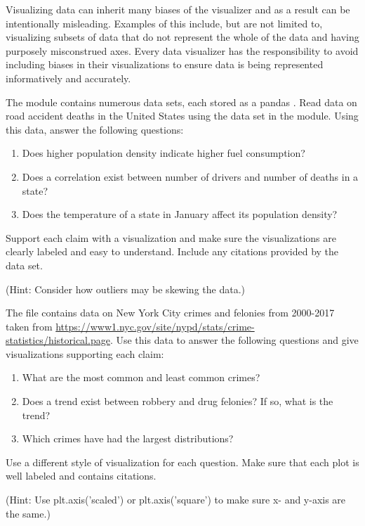 \begin{warn}
Visualizing data can inherit many biases of the visualizer and as a result can be intentionally misleading.
Examples of this include, but are not limited to, visualizing subsets of data that do not represent the whole of the data and having purposely misconstrued axes.
Every data visualizer has the responsibility to avoid including biases in their visualizations to ensure data is being represented informatively and accurately.
\end{warn}
\begin{problem}
The  module contains numerous data sets, each stored as a pandas .
Read data on road accident deaths in the United States using the data set  in the  module.
Using this data, answer the following questions:

\begin{enumerate}
\item Does higher population density indicate higher fuel consumption?
\item Does a correlation exist between number of drivers and number of deaths in a state?
\item Does the temperature of a state in January affect its population density?
\end{enumerate}

Support each claim with a visualization and make sure the visualizations are clearly labeled and easy to understand.
Include any citations provided by the data set.

(Hint: Consider how outliers may be skewing the data.)
\end{problem}

\begin{problem}
The file  contains data on New York City crimes and felonies from 2000-2017 taken from \url{https://www1.nyc.gov/site/nypd/stats/crime-statistics/historical.page}.
Use this data to answer the following questions and give visualizations supporting each claim:
\begin{enumerate}
\item What are the most common and least common crimes?
\item Does a trend exist between robbery and drug felonies? If so, what is the trend?
\item Which crimes have had the largest distributions?
\end{enumerate}
Use a different style of visualization for each question. 
Make sure that each plot is well labeled and contains citations.

(Hint: Use plt.axis('scaled') or plt.axis('square') to make sure x- and y-axis are the same.)
\end{problem}
